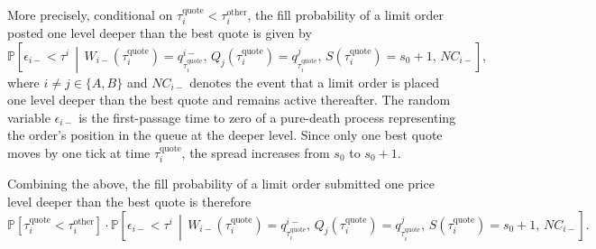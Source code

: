 \documentclass[11pt]{article}
\begin{document}
More precisely, conditional on $\tau_i^{\text{quote}} < \tau_i^{\text{other}}$, the fill probability of a limit order posted one level deeper than the best quote is given by
\begin{equation}\label{prob_level2_fill}
\mathbb{P}\!\left[
\epsilon_{i-} < \tau^i \,\middle|\,
W_{i-}(\tau_i^{\text{quote}})=q_{\tau_i^{\text{quote}}}^{i-},\,
Q_j(\tau_i^{\text{quote}})=q_{\tau_i^{\text{quote}}}^j,\,
S(\tau_i^{\text{quote}})=s_0+1,\,
NC_{i-}
\right],
\end{equation}
where $i\neq j\in\{A,B\}$ and $NC_{i-}$ denotes the event that a limit order is placed one level deeper than the best quote and remains active thereafter. The random variable $\epsilon_{i-}$ is the first-passage time to zero of a pure-death process representing the order's position in the queue at the deeper level. Since only one best quote moves by one tick at time $\tau_i^{\text{quote}}$, the spread increases from $s_0$ to $s_0+1$.

Combining the above, the fill probability of a limit order submitted one price level deeper than the best quote is therefore
\begin{equation}\label{prob_level2_fill_total}
\mathbb{P}\left[\tau_i^{\text{quote}} < \tau_i^{\text{other}}\right]\cdot
\mathbb{P}\!\left[
\epsilon_{i-} < \tau^i \,\middle|\,
W_{i-}(\tau_i^{\text{quote}})=q_{\tau_i^{\text{quote}}}^{i-},\,
Q_j(\tau_i^{\text{quote}})=q_{\tau_i^{\text{quote}}}^j,\,
S(\tau_i^{\text{quote}})=s_0+1,\,
NC_{i-}
\right].
\end{equation}
\end{document}
